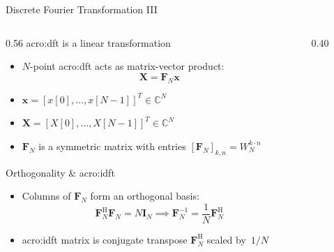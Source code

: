 \begin{frame}{Discrete Fourier Transformation III}
  \begin{columns}[T,onlytextwidth]
    \begin{column}{0.56\textwidth}
      \Gls{acro:dft} is a linear transformation
      \begin{itemize}
        \item $N$-point \gls{acro:dft} acts as matrix-vector product:
          \begin{equation*}
            \mathbf{X} = \mathbf{F}_N \mathbf{x}
          \end{equation*}
        \item $\mathbf{x} = [x[0], \dots, x[N-1]]^T \in \mathbb{C}^N$
        \item $\mathbf{X} = [X[0], \dots, X[N-1]]^T \in \mathbb{C}^N$
        \item $\mathbf{F}_N$ is a symmetric matrix with entries $[\mathbf{F}_N]_{k,n} = W_N^{k \cdot n}$
      \end{itemize}
      \vspace{0.4em}
      Orthogonality \& \gls{acro:idft}
      \begin{itemize}
        \item Columns of $\mathbf{F}_N$ form an orthogonal basis:
          \begin{equation*}
            \mathbf{F}_N^\mathrm{H} \mathbf{F}_N = N \mathbf{I}_N \implies \mathbf{F}_N^{-1} = \frac{1}{N}\mathbf{F}_N^\mathrm{H}
          \end{equation*}
        \item \Gls{acro:idft} matrix is conjugate transpose $\mathbf{F}_N^\mathrm{H}$ scaled by~$1/N$
      \end{itemize}
      \vspace{0.4em}
    \end{column}
    \begin{column}{0.40\textwidth}
\end{column}
\end{columns}
\end{frame}
